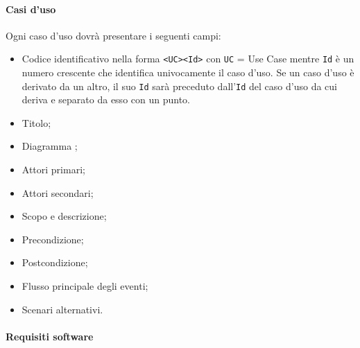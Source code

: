 \documentclass{scalatekids-article}
\begin{document}
\paragraph{Casi d'uso}

Ogni caso d'uso dovrà presentare i seguenti campi:
\begin{itemize}
    \item Codice identificativo nella forma \verb=<UC><Id>= con \verb=UC= = Use
        Case mentre \verb=Id= è un numero crescente che identifica univocamente il
        caso d'uso. Se un caso d'uso è derivato da un altro, il suo \verb=Id= sarà
        preceduto dall'\verb=Id= del caso d'uso da cui deriva e separato da esso con un
        punto.
    \item Titolo;
    \item Diagramma ;
    \item Attori primari;
    \item Attori secondari;
    \item Scopo e descrizione;
    \item Precondizione;
    \item Postcondizione;
    \item Flusso principale degli eventi;
    \item Scenari alternativi.
\end{itemize}

\paragraph{Requisiti software}
\end{document}
